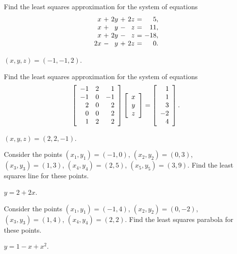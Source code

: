 \documentclass{ximera}
\author{Zack Reed}
\begin{document}
\begin{exercise}
  Find the least squares approximation for the system of equations
  \begin{equation*}
    \begin{array}{r@{~}c@{~}r@{~}c@{~}r@{~}c@{~}r}
       x &+& 2y &+& 2z &=&   5, \\
       x &+&  y &-&  z &=&  11, \\
       x &+& 2y &-&  z &=& -18, \\
      2x &-&  y &+& 2z &=&  0. \\
    \end{array}
  \end{equation*}
  \begin{solution}
    $(x,y,z) = (-1,-1,2)$.
  \end{solution}
\end{exercise}

\begin{exercise}
  Find the least squares approximation for the system of equations
  \begin{equation*}
    \startmat{rrr}
      -1 & 2 & 1 \\
      -1 & 0 & -1 \\
      2 & 0 & 2 \\
      0 & 0 & 2 \\
      1 & 2 & 2 \\
    \stopmat
    \startmat{c} x \\ y \\ z \stopmat
    =
    \startmat{r} 1 \\ 1 \\ 3 \\ -2 \\ 4 \stopmat.
  \end{equation*}
  \begin{solution}
    $(x,y,z) = (2,2,-1)$.
  \end{solution}
\end{exercise}

\begin{exercise}
  Consider the points $(x_1,y_1) = (-1,0)$, $(x_2,y_2) = (0,3)$,
  $(x_3,y_3) = (1,3)$, $(x_4,y_4) = (2,5)$, $(x_5,y_5) = (3,9)$.  Find
  the least squares line for these points.
  \begin{solution}
    $y = 2+2x$.
  \end{solution}
\end{exercise}

\begin{exercise}
  Consider the points $(x_1,y_1) = (-1,4)$, $(x_2,y_2) = (0,-2)$,
  $(x_3,y_3) = (1,4)$, $(x_4,y_4) = (2,2)$.  Find the least squares
  parabola for these points.
  \begin{solution}
    $y = 1-x+x^2$.
  \end{solution}
\end{exercise}
\end{document}

